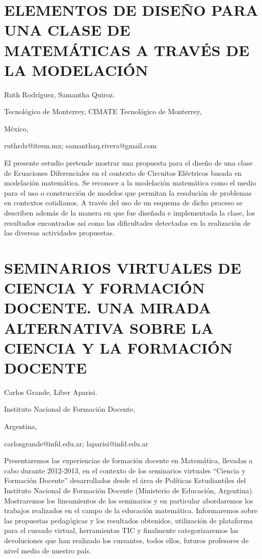 \setcounter{section}{88}


\section{ELEMENTOS DE DISEÑO PARA UNA CLASE DE MATEMÁTICAS A TRAVÉS DE LA
MODELACIÓN}

\begin{datos}

Ruth Rodríguez, Samantha Quiroz.

Tecnológico de Monterrey, CIMATE Tecnológico de Monterrey,

México,

ruthrdz@itesm.mx; samanthaq.rivera@gmail.com

\end{datos}

El presente estudio pretende mostrar una propuesta para el diseño
de una clase de Ecuaciones Diferenciales en el contexto de Circuitos
Eléctricos basada en modelación matemática. Se reconoce a la modelación
matemática como el medio para el uso o construcción de modelos que
permitan la resolución de problemas en contextos cotidianos. A través
del uso de un esquema de dicho proceso se describen además de la manera
en que fue diseñada e implementada la clase, los resultados encontrados
así como las dificultades detectadas en la realización de las diversas
actividades propuestas. 


\section{SEMINARIOS VIRTUALES DE CIENCIA Y FORMACIÓN DOCENTE. UNA MIRADA ALTERNATIVA
SOBRE LA CIENCIA Y LA FORMACIÓN DOCENTE}

\begin{datos}

Carlos Grande, Liber Aparisi.

Instituto Nacional de Formación Docente,

Argentina,

carlosgrande@infd.edu.ar; laparisi@infd.edu.ar 

\end{datos}

Presentaremos las experiencias de formación docente en Matemática,
llevadas a cabo durante 2012-2013, en el contexto de los seminarios
virtuales “Ciencia y Formación Docente” desarrollados desde el área
de Políticas Estudiantiles del Instituto Nacional de Formación Docente
(Ministerio de Educación, Argentina). Mostraremos los lineamientos
de los seminarios y en particular abordaremos los trabajos realizados
en el campo de la educación matemática. Informaremos sobre las propuestas
pedagógicas y los resultados obtenidos, utilización de plataforma
para el cursado virtual, herramientas TIC y finalmente categorizaremos
las devoluciones que han realizado los cursantes, todos ellos, futuros
profesores de nivel medio de nuestro país.


